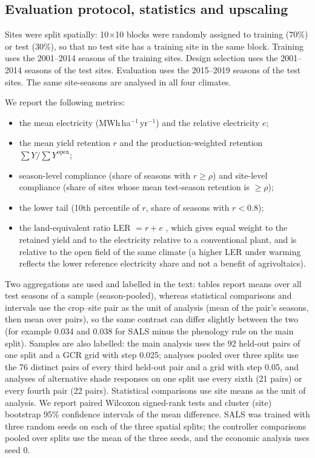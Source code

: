 \subsection{Evaluation protocol, statistics and upscaling}\label{sec:protocol}
Sites were split spatially: 10\textdegree{}$\times$10\textdegree{} blocks were randomly assigned to training (70\%) or test (30\%), so that no test site has a training site in the same block. Training uses the 2001--2014 seasons of the training sites. Design selection uses the 2001--2014 seasons of the test sites. Evaluation uses the 2015--2019 seasons of the test sites. The same site-seasons are analysed in all four climates.

We report the following metrics:
\begin{itemize}
\item the mean electricity (MWh\,ha$^{-1}$\,yr$^{-1}$) and the relative electricity $e$;
\item the mean yield retention $r$ and the production-weighted retention $\sum Y/\sum Y^{\mathrm{open}}$;
\item season-level compliance (share of seasons with $r\ge\rho$) and site-level compliance (share of sites whose mean test-season retention is $\ge\rho$);
\item the lower tail (10th percentile of $r$, share of seasons with $r<0.8$);
\item the land-equivalent ratio LER $=r+e$ \citep{dupraz2011}, which gives equal weight to the retained yield and to the electricity relative to a conventional plant, and is relative to the open field of the same climate (a higher LER under warming reflects the lower reference electricity share and not a benefit of agrivoltaics).
\end{itemize}
Two aggregations are used and labelled in the text: tables report means over all test seasons of a sample (season-pooled), whereas statistical comparisons and intervals use the crop--site pair as the unit of analysis (mean of the pair's seasons, then mean over pairs), so the same contrast can differ slightly between the two (for example 0.034 and 0.038 for SALS minus the phenology rule on the main split). Samples are also labelled: the main analysis uses the 92 held-out pairs of one split and a GCR grid with step 0.025; analyses pooled over three splits use the 76 distinct pairs of every third held-out pair and a grid with step 0.05, and analyses of alternative shade responses on one split use every sixth (21 pairs) or every fourth pair (22 pairs). Statistical comparisons use site means as the unit of analysis. We report paired Wilcoxon signed-rank tests and cluster (site) bootstrap 95\% confidence intervals of the mean difference. SALS was trained with three random seeds on each of the three spatial splits; the controller comparisons pooled over splits use the mean of the three seeds, and the economic analysis uses seed 0.

